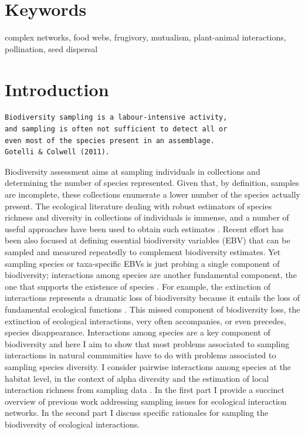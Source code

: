 \documentclass[12pt]{article}
\begin{document}
\section*{Keywords}
complex networks, food webs, frugivory, mutualism, plant-animal interactions, pollination, seed dispersal
\section*{Introduction}
\label{introduction}
\begin{verbatim}
Biodiversity sampling is a labour-intensive activity,   
and sampling is often not sufficient to detect all or   
even most of the species present in an assemblage.   
Gotelli & Colwell (2011).
\end{verbatim}

\linenumbers
Biodiversity assessment aims at sampling individuals in collections and determining the number of species represented. Given that, by definition, samples are incomplete, these collections enumerate a lower number of the species actually present. The ecological literature dealing with robust estimators of species richness and diversity in collections of individuals is immense, and a number of useful approaches have been used to obtain such estimates \citep{Magurran:1988mm,Gotelli:2001uo,Hortal:2006dc,Colwell:2009gv,Gotelli:2011tb}. Recent effort has been also focused at defining essential biodiversity variables (EBV) \citep{Pereira:2013ji} that can be sampled and measured repeatedly to complement biodiversity estimates. Yet sampling species or taxa-specific EBVs is just probing a single component of biodiversity; interactions among species are another fundamental component, the one that supports the existence of species \citep{Memmott:2006vy}. For example, the extinction of interactions represents a dramatic loss of biodiversity because it entails the loss of fundamental ecological functions \citep{ValienteBanuet:2014bw}. This missed component of biodiversity loss, the extinction of ecological interactions, very often accompanies, or even precedes, species disappearance. Interactions among species are a key component of biodiversity and here I aim to show that most problems associated to sampling interactions in natural communities have to do with problems associated to sampling species diversity. I consider pairwise interactions among species at the habitat level, in the context of alpha diversity and the estimation of local interaction richness from sampling data \citep{Mao:2005tka}. In the first part I provide a succinct overview of previous work addressing sampling issues for ecological interaction networks. In the second part I discuss specific rationales for sampling the biodiversity of ecological interactions. 
\end{document}

